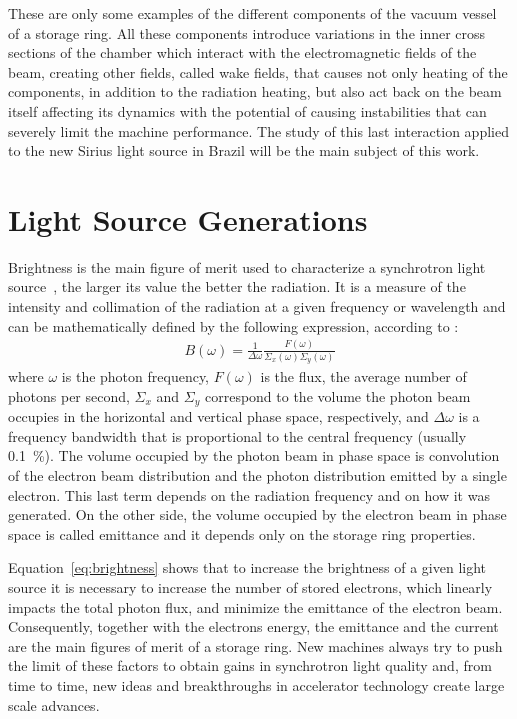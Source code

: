     These are only some examples of the different components of the vacuum vessel of a storage ring. All these components introduce variations in the inner cross sections of the chamber which interact with the electromagnetic fields of the beam, creating other fields, called wake fields, that causes not only heating of the components, in addition to the radiation heating, but also act back on the beam itself affecting its dynamics with the potential of causing instabilities that can severely limit the machine performance. The study of this last interaction applied to the new Sirius light source in Brazil will be the main subject of this work.

\section{Light Source Generations}

    Brightness is the main figure of merit used to characterize a synchrotron light source~\cite{Hettel2014a}, the larger its value the better the radiation. It is a measure of the intensity and collimation of the radiation at a given frequency or wavelength and can be mathematically defined by the following expression, according to :
    \begin{align}\label{eq:brightness}
        B(\omega) = \frac{1}{\Delta\omega}\frac{F(\omega)}{\Sigma_x(\omega)\Sigma_y(\omega)}
    \end{align}
    where $\omega$ is the photon frequency, $F(\omega)$ is the flux, the average number of photons per second, $\Sigma_x$ and $\Sigma_y$ correspond to the volume the photon beam occupies in the horizontal and vertical phase space, respectively, and $\Delta\omega$ is a frequency bandwidth that is proportional to the central frequency (usually \SI{0.1}{\percent}). The volume occupied by the photon beam in phase space is convolution of the electron beam distribution and the photon distribution emitted by a single electron. This last term depends on the radiation frequency and on how it was generated. On the other side, the volume occupied by the electron beam in phase space is called emittance and it depends only on the storage ring properties.

    Equation~\eqref{eq:brightness} shows that to increase the brightness of a given light source it is necessary to increase the number of stored electrons, which linearly impacts the total photon flux, and minimize the emittance of the electron beam. Consequently, together with the electrons energy, the emittance and the current are the main figures of merit of a storage ring. New machines always try to push the limit of these factors to obtain gains in synchrotron light quality and, from time to time, new ideas and breakthroughs in accelerator technology create large scale advances.

